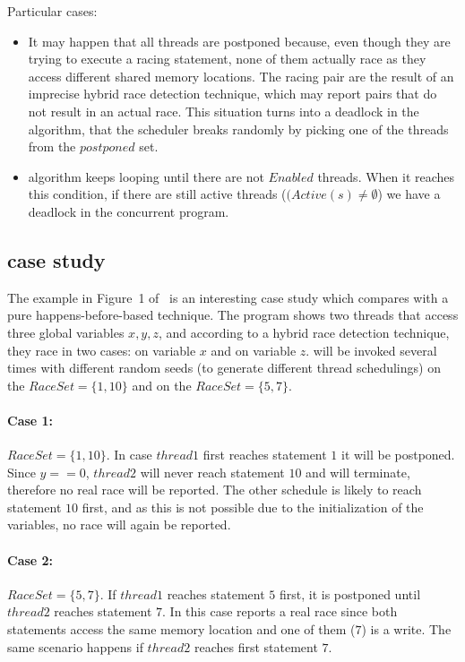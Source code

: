 \begin{refsection}
\noindent
Particular cases:

\begin{itemize}
\item It may happen that all threads are postponed because, even though they
  are trying to execute a racing statement, none of them actually race as they
  access different shared memory locations.
  The racing pair are the result of an imprecise hybrid race detection
  technique, which may report pairs that do not result in an actual race.
  This situation turns into a deadlock in the \rfuz algorithm, that the
  scheduler breaks randomly by picking one of the threads from the $postponed$
  set.
\item \rfuz algorithm keeps looping until there are not $Enabled$
  threads. When it reaches this condition, if there are still active threads
  ($(Active(s) \neq \emptyset$) we have a deadlock in the concurrent program.
\end{itemize}

\subsection*{\rfuz case study}
\label{sec:member21}

The example in Figure~1 of~\cite{Sen:2008:RDR:1375581.1375584} is an
interesting case study which compares \rfuz with a pure
happens-before-based technique.
%
The program shows two threads that access three global variables $x, y, z$,
and according to a hybrid race detection technique, they race in two cases: on
variable $x$ and on variable $z$.
%
\rfuz will be invoked several times with different random seeds (to generate
different thread schedulings) on the $RaceSet=\{1, 10\}$ and on the
$RaceSet=\{5,7\}$.

\paragraph{Case 1:} $RaceSet=\{1, 10\}$. In case $thread1$ first reaches
statement $1$ it will be postponed.
%
Since $y == 0$, $thread2$ will never reach statement $10$ and will terminate,
therefore no real race will be reported.
%
The other schedule is likely to reach statement $10$ first, and as this is not
possible due to the initialization of the variables, no race will again be
reported.

\paragraph{Case 2:} $RaceSet=\{5, 7\}$. If $thread1$ reaches statement $5$
first, it is postponed until $thread2$ reaches statement $7$.
%
In this case \rfuz reports a real race since both statements access the same
memory location and one of them ($7$) is a write.
%
The same scenario happens if $thread2$ reaches first statement $7$.


\end{refsection}
